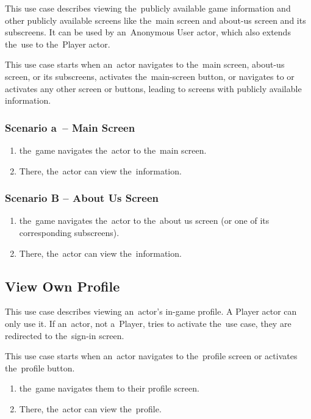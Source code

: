 This use case describes viewing the~publicly available game information and other publicly available screens like the~main screen and about-us screen and its subscreens.
It can be used by an~Anonymous User actor, which also extends the~use to the~Player actor.

This use case starts when an~actor navigates to the~main screen, about-us screen, or its subscreens, activates the~main-screen button, or navigates to or activates any other screen or buttons, leading to screens with publicly available information.

\subsubsection*{Scenario a~-- Main Screen}

\begin{enumerate}
    \item the~game navigates the~actor to the~main screen.
    \item There, the~actor can view the~information.
\end{enumerate}

\subsubsection*{Scenario B -- About Us Screen}

\begin{enumerate}
    \item the~game navigates the~actor to the~about us screen (or one of its corresponding subscreens).
    \item There, the~actor can view the~information.
\end{enumerate}

\subsection{View Own Profile}

This use case describes viewing an~actor's in-game profile.
A Player actor can only use it.
If an~actor, not a~Player, tries to activate the~use case, they are redirected to the~sign-in screen.

This use case starts when an~actor navigates to the~profile screen or activates the~profile button.

\begin{enumerate}
    \item the~game navigates them to their profile screen.
    \item There, the~actor can view the~profile.
\end{enumerate}

